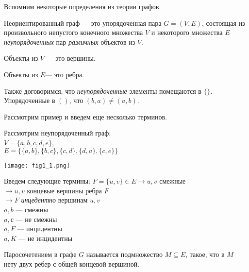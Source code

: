 \documentclass[../../main.tex]{subfiles}
\begin{document}
Вспомним некоторые определения из теории графов.
\begin{defn}
    Неориентированный граф --- это упорядоченная пара $G=(V,E)$, состоящая
    из произвольного непустого конечного множества $V$ и некоторого 
    множества $E$ 
    \emph{неупорядоченных} пар \emph{различных} объектов из $V$.
\end{defn}

Объекты из $V$ --- это вершины.

Объекты из $E$--- это ребра.

Также договоримся, что \emph{неупорядоченные} элементы помещаются в $\{\}$.
Упорядоченные в $()$, что $(b,a) \neq (a,b)$.

Рассмотрим пример и введем еще несколько терминов.
\begin{example}
    Рассмотрим неупорядоченный граф: \\ 
    $V=\{a, b, c, d, e\}$, \\
    $E=\{\{a, b\}, \{b, c\}, \{c, d\}, \{d, a\}, \{c, e\}\}$

    \texttt{[image: fig1\_1.png]}
    
    Введем следующие термины:
    $F=\{u, v\} \in E \to u, v$ смежные \\
    $\to u, v$ концевые вершины ребра $F$ \\
    $\to F$ \emph{инцедентно} вершинам $u, v$ \\
    $a, b$ --- смежны \\
    $a, с$ --- не смежны \\
    $a, F$ --- инцидентны \\
    $a, K$ --- не инцидентны \\
\end{example}

\begin{defn}
    Паросочетением в графе $G$ называется подмножество $M\subseteq E$, 
    такое, что в $M$ нету двух ребер с общей концевой вершиной. 
\end{defn}
\end{document}
